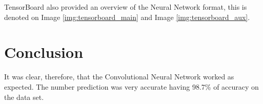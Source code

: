 \documentclass[journal]{IEEEtran}
\begin{document}
TensorBoard also provided an overview of the Neural Network format, this is denoted on Image \ref{img:tensorboard_main} and Image \ref{img:tensorboard_aux}.

%

\section {Conclusion}

It was clear, therefore, that the Convolutional Neural Network worked as expected. The number prediction was very accurate having 98.7\% of accuracy on the data set.

\vfill
\end{document}

